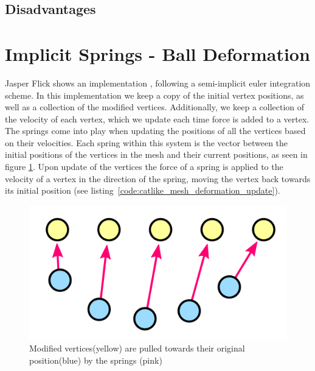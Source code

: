 \subsection{Disadvantages}

\section{Implicit Springs - Ball Deformation}
Jasper Flick\cite{catlike_mesh_deformation} shows an implementation , following a semi-implicit euler integration scheme.
In this implementation we keep a copy of the initial vertex positions, as well as a collection of the modified vertices.
Additionally, we keep a collection of the velocity of each vertex, which we update each time force is added to a vertex.
The springs come into play when updating the positions of all the vertices based on their velocities.
Each spring within this system is the vector between the initial positions of the vertices in the mesh and their current positions, as seen in figure \ref{fig:catlike_mesh_deformation_springs}.
Upon update of the vertices the force of a spring is applied to the velocity of a vertex in the direction of the spring, moving the vertex back towards its initial position (see listing~\ref{code:catlike_mesh_deformation_update}).

\begin{figure}
    \includegraphics[width=\textwidth]{report/figures/catlike_mesh_deformation_springs.png}
    \caption{Modified vertices(yellow) are pulled towards their original position(blue) by the springs (pink)\cite{catlike_mesh_deformation}}
    \label{fig:catlike_mesh_deformation_springs}
\end{figure}

